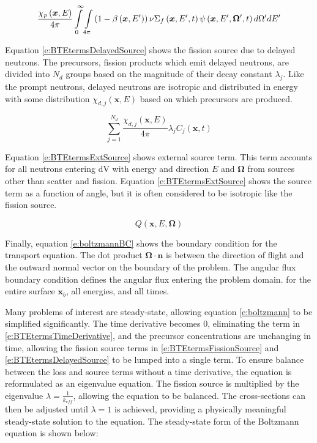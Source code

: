 \begin{equation}\label{e:BTEtermsFissionSource}
{\frac{\chi_p\left(\bm x,E\right)}{4\pi} \intop_0^{\infty} \intop_{4\pi} \left(1 - \beta\left(\bm x,E'\right)\right) \nu \Sigma_f\left(\bm x,E',t\right) \psi\left(\bm x,E',\bm \Omega',t\right) d\Omega' dE'}
\end{equation}

Equation \ref{e:BTEtermsDelayedSource} shows the fission source due to delayed neutrons.  The precursors, fission products which emit delayed neutrons, are divided into $N_d$ groups based on the magnitude of their decay constant $\lambda_j$.  Like the prompt neutrons, delayed neutrons are isotropic and distributed in energy with some distribution $\chi_{d,j}\left(\bm x,E\right)$ based on which precursors are produced.

\begin{equation}\label{e:BTEtermsDelayedSource}
{\sum_{j=1}^{N_d} \frac{\chi_{d,j}\left(\bm x,E\right)}{4\pi} \lambda_j C_j\left(\bm x,t\right)}
\end{equation}

Equation \ref{e:BTEtermsExtSource} shows external source term.  This term accounts for all neutrons entering dV with energy and direction $E$ and $\bm\Omega$ from sources other than scatter and fission.  Equation \ref{e:BTEtermsExtSource} shows the source term as a function of angle, but it is often considered to be isotropic like the fission source.

\begin{equation}\label{e:BTEtermsExtSource}
Q\left(\bm x,E,\bm\Omega\right)
\end{equation}

Finally, equation \ref{e:boltzmannBC} shows the boundary condition for the transport equation.  The dot product $\bm \Omega \cdot \bm n$ is between the direction of flight and the outward normal vector on the boundary of the problem.  The angular flux boundary condition defines the angular flux entering the problem domain. for the entire surface $\bm x_b$, all energies, and all times.

Many problems of interest are steady-state, allowing equation \ref{e:boltzmann} to be simplified significantly.  The time derivative becomes 0, eliminating the term in \ref{e:BTEtermsTimeDerivative}, and the precursor concentrations are unchanging in time, allowing the fission source terms in \ref{e:BTEtermsFissionSource} and \ref{e:BTEtermsDelayedSource} to be lumped into a single term.  To ensure balance between the loss and source terms without a time derivative, the equation is reformulated as an eigenvalue equation.  The fission source is multiplied by the eigenvalue $\lambda = \frac{1}{k_{eff}}$, allowing the equation to be balanced.  The cross-sections can then be adjusted until $\lambda = 1$ is achieved, providing a physically meaningful steady-state solution to the equation.  The steady-state form of the Boltzmann equation is shown below:

